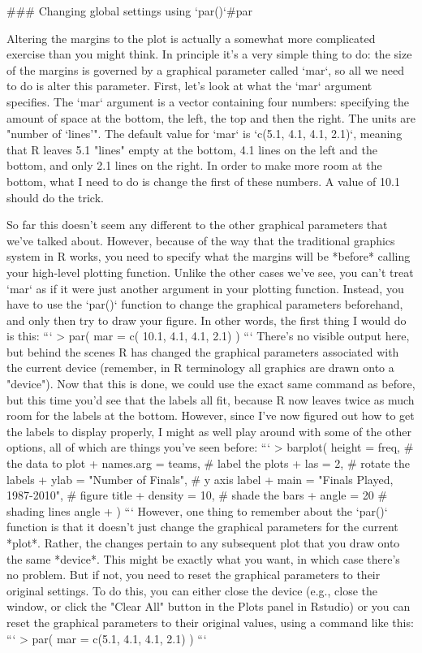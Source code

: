 ### Changing global settings using `par()`{#par}

Altering the margins to the plot is actually a somewhat more complicated exercise than you might think. In principle it's a very simple thing to do: the size of the margins is governed by a graphical parameter called `mar`, so all we need to do is alter this parameter. First, let's look at what the `mar` argument specifies. The `mar` argument is a vector containing four numbers: specifying the amount of space at the bottom, the left, the top and then the right. The units are "number of `lines'". The default value for `mar` is `c(5.1, 4.1, 4.1, 2.1)`, meaning that R leaves 5.1 "lines" empty at the bottom, 4.1 lines on the left and the bottom, and only 2.1 lines on the right. In order to make more room at the bottom, what I need to do is change the first of these numbers. A value of 10.1 should do the trick. 

So far this doesn't seem any different to the other graphical parameters that we've talked about. However, because of the way that the traditional graphics system in R works, you need to specify what the margins will be *before* calling your high-level plotting function. Unlike the other cases we've see, you can't treat `mar` as if it were just another argument in your plotting function. Instead, you have to use the `par()` function to change the graphical parameters beforehand, and only then try to draw your figure. In other words, the first thing I would do is this:
``` 
> par( mar = c( 10.1, 4.1, 4.1, 2.1) )
```
There's no visible output here, but behind the scenes R has changed the graphical parameters associated with the current device (remember, in R terminology all graphics are drawn onto a "device"). Now that this is done, we could use the exact same command as before, but this time you'd see that the labels all fit, because R now leaves twice as much room for the labels at the bottom. However, since I've now figured out how to get the labels to display properly, I might as well play around with some of the other options, all of which are things you've seen before:
```
> barplot( height = freq,                      # the data to plot 
+          names.arg = teams,                  # label the plots
+          las = 2,                            # rotate the labels
+          ylab = "Number of Finals",          # y axis label
+          main = "Finals Played, 1987-2010",  # figure title
+          density = 10,                       # shade the bars
+          angle = 20                          # shading lines angle
+ )
```
However, one thing to remember about the `par()` function is that it doesn't just change the graphical parameters for the current *plot*. Rather, the changes pertain to any subsequent plot that you draw onto the same *device*. This might be exactly what you want, in which case there's no problem. But if not, you need to reset the graphical parameters to their original settings. To do this, you can either close the device (e.g., close the window, or click the "Clear All" button in the Plots panel in Rstudio) or you can reset the graphical parameters to their original values, using a command like this:
```
> par( mar = c(5.1, 4.1, 4.1, 2.1) )
```


